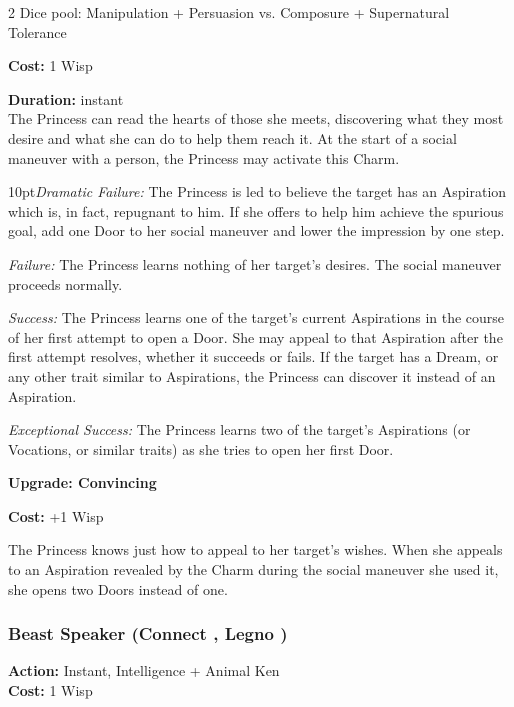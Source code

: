 \begin{multicols}{2}
\noindent Dice pool: Manipulation + Persuasion vs. Composure + Supernatural Tolerance

\noindent \textbf{Cost:} 1 Wisp

\noindent \textbf{Duration:} instant\\

The Princess can read the hearts of those she meets, discovering what they most desire and what she can do to help them reach it. At the start of a social maneuver with a person, the Princess may activate this Charm.

\begin{myindentpar}{10pt}\emph{Dramatic Failure:}  The Princess is led to believe the target has an Aspiration which is, in fact, repugnant to him. If she offers to help him achieve the spurious goal, add one Door to her social maneuver and lower the impression by one step.
 
\emph{Failure:} The Princess learns nothing of her target’s desires. The social maneuver proceeds normally.

\emph{Success:} The Princess learns one of the target’s current Aspirations in the course of her first attempt to open a Door. She may appeal to that Aspiration after the first attempt resolves, whether it succeeds or fails. If the target has a Dream, or any other trait similar to Aspirations, the Princess can discover it instead of an Aspiration.

\emph{Exceptional Success:} The Princess learns two of the target’s Aspirations (or Vocations, or similar traits) as she tries to open her first Door.

\textbf{Upgrade: Convincing}

\noindent \textbf{Cost:} +1 Wisp

The Princess knows just how to appeal to her target’s wishes. When she appeals to an Aspiration revealed by the Charm during the social maneuver she used it, she opens two Doors instead of one.
\end{myindentpar}

\subsubsection*{Beast Speaker (Connect \textbullet\textbullet, Legno \textbullet)}

\noindent \textbf{Action:} Instant, Intelligence + Animal Ken\\

\noindent \textbf{Cost:} 1 Wisp\\


\end{multicols}
